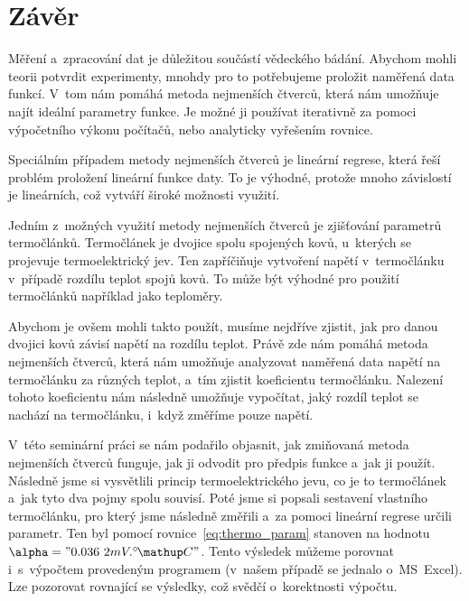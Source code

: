 \section{Závěr}
Měření a~zpracování dat je důležitou součástí vědeckého bádání. Abychom mohli
teorii potvrdit experimenty, mnohdy pro to potřebujeme proložit naměřená data
funkcí. V~tom nám pomáhá metoda nejmenších čtverců, která nám umožňuje najít
ideální parametry funkce. Je možné ji používat iterativně za pomoci výpočetního
výkonu počítačů, nebo analyticky vyřešením rovnice.

Speciálním případem metody nejmenších čtverců je lineární regrese, která řeší
problém proložení lineární funkce daty. To je výhodné, protože mnoho závislostí
je lineárních, což vytváří široké možnosti využití.

Jedním z~možných využití metody nejmenších čtverců je zjišťování parametrů
termočlánků. Termočlánek je dvojice spolu spojených kovů, u~kterých se
projevuje termoelektrický jev. Ten zapříčiňuje vytvoření napětí v~termočlánku
v~případě rozdílu teplot spojů kovů. To může být výhodné pro použití
termočlánků například jako teploměry. 

Abychom je ovšem mohli takto použít, musíme nejdříve zjistit, jak pro danou
dvojici kovů závisí napětí na rozdílu teplot. Právě zde nám pomáhá metoda
nejmenších čtverců, která nám umožňuje analyzovat naměřená data napětí na
termočlánku za různých teplot, a~tím zjistit koeficientu termočlánku.
Nalezení tohoto koeficientu nám následně umožňuje vypočítat, jaký rozdíl teplot
se nachází na termočlánku, i~když změříme pouze napětí.

V~této seminární práci se nám podařilo objasnit, jak zmiňovaná metoda
nejmenších čtverců funguje, jak ji odvodit pro předpis funkce a~jak ji použít.
Následně jsme si vysvětlili princip termoelektrického jevu, co je to
termočlánek a~jak tyto dva pojmy spolu souvisí. Poté jsme si popsali sestavení
vlastního termočlánku, pro který jsme následně změřili a~za pomoci lineární
regrese určili parametr. Ten byl pomocí rovnice~\ref{eq:thermo_param} stanoven
na  hodnotu~$\alpha="0.036~2 mV.\C"$. Tento výsledek můžeme porovnat
i~s~výpočtem provedeným programem (v~našem případě se jednalo o~MS~Excel).
Lze pozorovat rovnající se výsledky, což svědčí o~korektnosti výpočtu.

